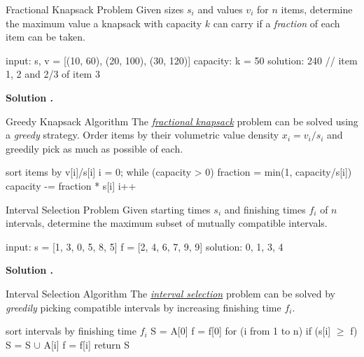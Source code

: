 \documentclass{cognito}
\begin{document}
\begin{note}{Fractional Knapsack Problem}
	Given sizes $s_i$ and values $v_i$ for $n$ items, determine the maximum value
	a knapsack with capacity $k$ can carry if a \emph{fraction} of each item can be taken.
	\begin{largecode}
 input: s, v = [(10, 60), (20, 100), (30, 120)]
 capacity: k = 50
 solution: 240  // item 1, 2 and 2/3 of item 3
	\end{largecode}
	\bf Solution \hyperref[note:Greedy Knapsack Algorithm]{\solutionref}.
\end{note}

\begin{note}{Greedy Knapsack Algorithm}
	The \hyperref[note:Fractional Knapsack Problem]{\it fractional knapsack} problem can be solved using a \emph{greedy} strategy.
	Order items by their volumetric value density $x_i = v_i/s_i$ and greedily pick as much as possible of each.

	\begin{largecode}
 sort items by v[i]/s[i]
 i = 0; 
 while (capacity > 0)
 	fraction = min(1, capacity/s[i])
	capacity -= fraction * s[i]
	i++
	\end{largecode}
	\vspace{-5pt}
\end{note}

\begin{note}{Interval Selection Problem}
	Given starting times $s_i$ and finishing times $f_i$ of $n$ intervals,
	determine the maximum subset of mutually compatible intervals.
	\begin{largecode}
 input: s = [1, 3, 0, 5, 8, 5]
        f = [2, 4, 6, 7, 9, 9]
 solution: {0, 1, 3, 4}
	\end{largecode}
	\bf Solution \hyperref[note:Interval Selection Algorithm]{\solutionref}.
\end{note}

\begin{note}{Interval Selection Algorithm}
	The \hyperref[note:Interval Selection Problem]{\it interval selection} problem can be solved by \emph{greedily}
	picking compatible intervals by increasing finishing time $f_i$.
	\begin{largecode}
 sort intervals by finishing time $f_i$
 S = {A[0]}
 f = f[0]
 for (i from 1 to n)
 	if (s[i] $\geq$ f)
		S = S $\cup$ {A[i]}
		f = f[i]
 return S
	\end{largecode}
	\vspace{-5pt}
\end{note}
\end{document}
